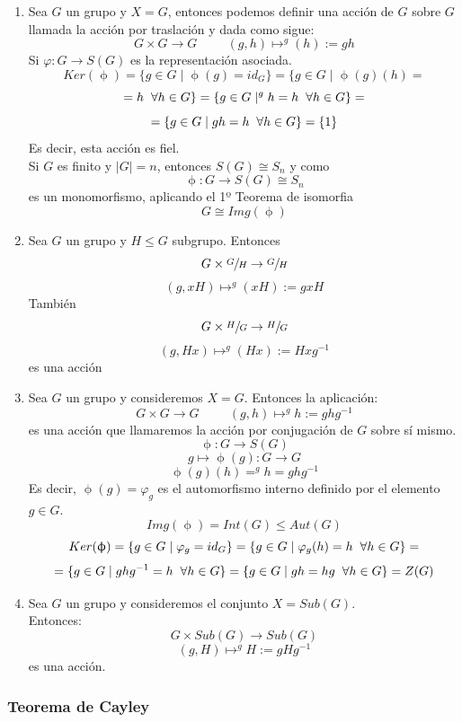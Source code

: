 \documentclass[11pt,a4paper]{article}
\begin{document}
\begin{enumerate}[label = \arabic*)]
\item  Sea $G$ un grupo y $X = G$, entonces podemos definir una acción de $G$ sobre $G$ llamada la acción por traslación y dada como sigue:
$$G \times G \to G \hspace{1cm} (g, h) \mapsto ^{g}(h) := gh$$
Si $\varphi: G \to S(G)$ es la representación asociada.
$$Ker(\upphi) = \{g \in G \mid \upphi(g) = id_{G}\} = \{g \in G \mid \upphi(g)(h) =$$ $$= h \hspace{0.2cm} \forall h \in G\} = \{g \in G \mid ^{g}h = h \hspace{0.2cm} \forall h \in G\} =$$ $$= \{g \in G \mid gh = h \hspace{0.2cm} \forall h \in G \} = \{1\}$$
Es decir, esta acción es fiel. \\
Si $G$ es finito y $|G| = n$, entonces $S(G) \cong S_{n}$ y como
$$\upphi: G \to S(G) \cong S_{n}$$
es un monomorfismo, aplicando el 1º Teorema de isomorfia
$$G \cong Img(\upphi)$$
\item Sea $G$ un grupo y $H \leqslant G$ subgrupo. Entonces
$$G \times \sfrac{G}{H} \to \sfrac{G}{H}$$
$$(g, xH) \mapsto ^{g}(xH) := gxH$$
También
$$G \times \sfrac{H}{G} \to \sfrac{H}{G}$$
$$(g, Hx) \mapsto ^{g}(Hx) := Hxg^{-1}$$
es una acción
\item Sea $G$ un grupo y consideremos $X = G$. Entonces la aplicación:
$$G \times G \to G \hspace{1cm} (g, h) \mapsto ^{g}h := ghg^{-1}$$
es una acción que llamaremos la acción por conjugación de $G$ sobre sí mismo.
$$\upphi: G \to S(G)$$
$$g \mapsto \upphi(g): G \to G$$
$$\upphi(g)(h) = ^{g}h = ghg^{-1}$$
Es decir, $\upphi(g) = \varphi_{g}$ es el automorfismo interno definido por el elemento $g \in G$.
$$Img(\upphi) = Int(G) \leqslant Aut(G)$$
$$Ker(\upphi) = \{g \in G \mid \varphi_{g} = id_{G}\} = \{g \in G \mid \varphi_{g}(h) = h \hspace{0.2cm} \forall h \in G\} =$$ $$=\{g \in G \mid ghg^{-1} = h \hspace{0.2cm} \forall h \in G\} =\{g \in G \mid gh = hg \hspace{0.2cm} \forall h \in G\} = Z(G)$$
\item Sea $G$ un grupo y consideremos el conjunto $X = Sub(G)$. \\
Entonces:
$$G \times Sub(G) \to Sub(G)$$
$$(g, H) \mapsto ^{g}H := gHg^{-1}$$
es una acción.
\end{enumerate}

\subsubsection*{Teorema de Cayley}
\end{document}
